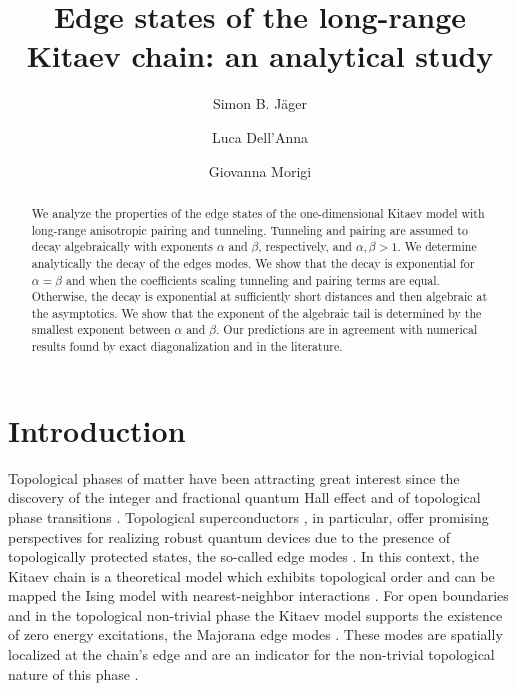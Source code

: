 \documentclass[pra,twocolumn,
superscriptaddress,
showpacs,
aps
]{revtex4-1}
\begin{document}
	
\title{Edge states of the long-range Kitaev chain: an analytical study}
	\author{Simon B. J\"ager} 
   \author{Luca Dell'Anna}
	\author{Giovanna Morigi} 
\begin{abstract}
We analyze the properties of the edge states of the one-dimensional Kitaev model with long-range anisotropic pairing and tunneling. Tunneling and pairing are assumed to decay algebraically with exponents $\alpha$ and $\beta$, respectively, and $\alpha,\beta>1$. We determine analytically the decay of the edges modes. We show that the decay is exponential for $\alpha=\beta$ and when the coefficients scaling tunneling and pairing terms are equal. Otherwise, the decay is exponential at sufficiently short distances and then algebraic at the asymptotics. We show that the exponent of the algebraic tail is determined by the smallest exponent between $\alpha$ and $\beta$. Our predictions are in agreement with numerical results found by exact diagonalization and in the literature.
\end{abstract}
%	
	\maketitle
\section{Introduction}

Topological phases of matter have been attracting great interest since the discovery of the integer and fractional quantum Hall effect \cite{Klitzing:1980, Fractional:Hall:Effect} and of topological phase transitions \cite{NobelpriceTop:2016}. Topological superconductors \cite{Hasan:2010,Bernegiv:2013}, in particular, offer promising perspectives for realizing robust quantum devices \cite{Kitaev2008,Nayak2008,Stern:2010} due to the presence of topologically protected states, the so-called edge modes \cite{Kitaev2001}. In this context, the Kitaev chain is a theoretical model which exhibits topological order \cite{Kitaev2001} and can be mapped the Ising model with nearest-neighbor interactions \cite{Greiter:2014}. For open boundaries and in the topological non-trivial phase the Kitaev model supports the existence of zero energy excitations, the Majorana edge modes  \cite{Kitaev2001}. These modes are spatially localized at the chain's edge and are an indicator for the non-trivial topological nature of this phase \cite{Ryu:2002}. 
\end{document}
